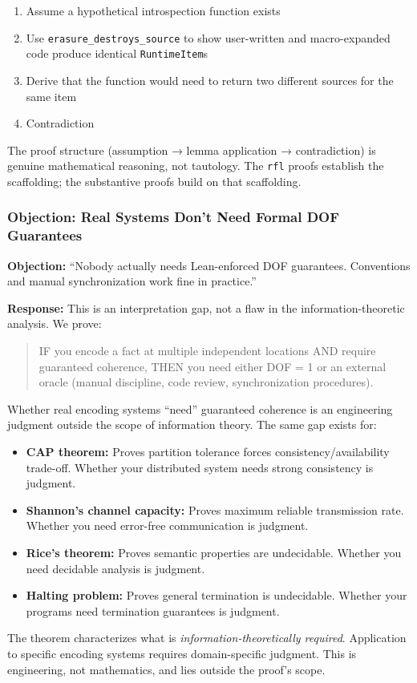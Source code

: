 \begin{enumerate}
\item Assume a hypothetical introspection function exists
\item Use \texttt{erasure\_destroys\_source} to show user-written and macro-expanded code produce identical \texttt{RuntimeItem}s
\item Derive that the function would need to return two different sources for the same item
\item Contradiction
\end{enumerate}

The proof structure (assumption → lemma application → contradiction) is genuine mathematical reasoning, not tautology. The \texttt{rfl} proofs establish the scaffolding; the substantive proofs build on that scaffolding.

\subsubsection{Objection: Real Systems Don't Need Formal DOF Guarantees}

\textbf{Objection:} ``Nobody actually needs Lean-enforced DOF guarantees. Conventions and manual synchronization work fine in practice.''

\textbf{Response:} This is an interpretation gap, not a flaw in the information-theoretic analysis. We prove:

\begin{quote}
IF you encode a fact at multiple independent locations AND require guaranteed coherence, THEN you need either DOF = 1 or an external oracle (manual discipline, code review, synchronization procedures).
\end{quote}

Whether real encoding systems ``need'' guaranteed coherence is an engineering judgment outside the scope of information theory. The same gap exists for:

\begin{itemize}
\tightlist
\item \textbf{CAP theorem:} Proves partition tolerance forces consistency/availability trade-off. Whether your distributed system needs strong consistency is judgment.
\item \textbf{Shannon's channel capacity:} Proves maximum reliable transmission rate. Whether you need error-free communication is judgment.
\item \textbf{Rice's theorem:} Proves semantic properties are undecidable. Whether you need decidable analysis is judgment.
\item \textbf{Halting problem:} Proves general termination is undecidable. Whether your programs need termination guarantees is judgment.
\end{itemize}

The theorem characterizes what is \emph{information-theoretically required}. Application to specific encoding systems requires domain-specific judgment. This is engineering, not mathematics, and lies outside the proof's scope.

 
